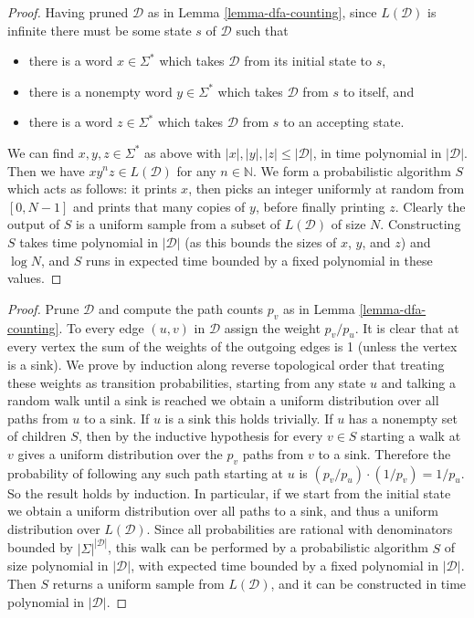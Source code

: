\documentclass[a4paper,USenglish,numberwithinsect]{lipics}
\theoremstyle{plain}
\theoremstyle{definition}
\newcommand{\N}{\mathbb{N}}
\begin{document}
\lemmaDFAPumpSamp*
\begin{proof}
Having pruned $\mathcal{D}$ as in Lemma \ref{lemma-dfa-counting}, since $L(\mathcal{D})$ is infinite there must be some state $s$ of $\mathcal{D}$ such that
\begin{itemize}
\item there is a word $x \in \Sigma^*$ which takes $\mathcal{D}$ from its initial state to $s$,
\item there is a nonempty word $y \in \Sigma^*$ which takes $\mathcal{D}$ from $s$ to itself, and
\item there is a word $z \in \Sigma^*$ which takes $\mathcal{D}$ from $s$ to an accepting state.
\end{itemize}
We can find $x,y,z \in \Sigma^*$ as above with $|x|,|y|,|z| \le |\mathcal{D}|$, in time polynomial in $|\mathcal{D}|$. Then we have $x y^n z \in L(\mathcal{D})$ for any $n \in \N$. We form a probabilistic algorithm $S$ which acts as follows: it prints $x$, then picks an integer uniformly at random from $[0,N-1]$ and prints that many copies of $y$, before finally printing $z$. Clearly the output of $S$ is a uniform sample from a subset of $L(\mathcal{D})$ of size $N$. Constructing $S$ takes time polynomial in $|\mathcal{D}|$ (as this bounds the sizes of $x$, $y$, and $z$) and $\log N$, and $S$ runs in expected time bounded by a fixed polynomial in these values.
\end{proof}

\lemmaDFAUnifSamp*
\begin{proof}
Prune $\mathcal{D}$ and compute the path counts $p_v$ as in Lemma \ref{lemma-dfa-counting}. To every edge $(u,v)$ in $\mathcal{D}$ assign the weight $p_v / p_u$. It is clear that at every vertex the sum of the weights of the outgoing edges is 1 (unless the vertex is a sink). We prove by induction along reverse topological order that treating these weights as transition probabilities, starting from any state $u$ and talking a random walk until a sink is reached we obtain a uniform distribution over all paths from $u$ to a sink. If $u$ is a sink this holds trivially. If $u$ has a nonempty set of children $S$, then by the inductive hypothesis for every $v \in S$ starting a walk at $v$ gives a uniform distribution over the $p_v$ paths from $v$ to a sink. Therefore the probability of following any such path starting at $u$ is $(p_v/p_u) \cdot (1/p_v) = 1/p_u$. So the result holds by induction. In particular, if we start from the initial state we obtain a uniform distribution over all paths to a sink, and thus a uniform distribution over $L(\mathcal{D})$. Since all probabilities are rational with denominators bounded by ${|\Sigma|}^{|\mathcal{D}|}$, this walk can be performed by a probabilistic algorithm $S$ of size polynomial in $|\mathcal{D}|$, with expected time bounded by a fixed polynomial in $|\mathcal{D}|$. Then $S$ returns a uniform sample from $L(\mathcal{D})$, and it can be constructed in time polynomial in $|\mathcal{D}|$.
\end{proof}
\end{document}
